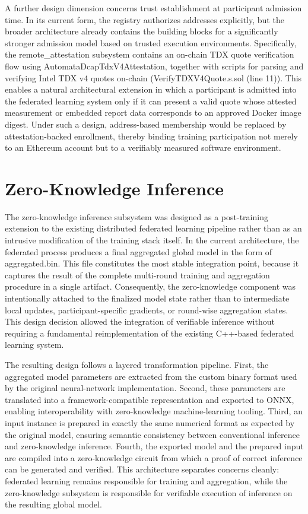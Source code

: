 A further design dimension concerns trust establishment at participant admission time. In its current form, the registry authorizes addresses explicitly, but the broader architecture already contains the building blocks for a significantly stronger admission model based on trusted execution environments. Specifically, the remote_attestation subsystem contains an on-chain TDX quote verification flow using AutomataDcapTdxV4Attestation, together with scripts for parsing and verifying Intel TDX v4 quotes on-chain (VerifyTDXV4Quote.s.sol (line 11)). This enables a natural architectural extension in which a participant is admitted into the federated learning system only if it can present a valid quote whose attested measurement or embedded report data corresponds to an approved Docker image digest. Under such a design, address-based membership would be replaced by attestation-backed enrollment, thereby binding training participation not merely to an Ethereum account but to a verifiably measured software environment.

\section{Zero-Knowledge Inference}

The zero-knowledge inference subsystem was designed as a post-training extension to the existing distributed federated learning pipeline rather than as an intrusive modification of the training stack itself. In the current architecture, the federated process produces a final aggregated global model in the form of aggregated.bin. This file constitutes the most stable integration point, because it captures the result of the complete multi-round training and aggregation procedure in a single artifact. Consequently, the zero-knowledge component was intentionally attached to the finalized model state rather than to intermediate local updates, participant-specific gradients, or round-wise aggregation states. This design decision allowed the integration of verifiable inference without requiring a fundamental reimplementation of the existing C++-based federated learning system.

The resulting design follows a layered transformation pipeline. First, the aggregated model parameters are extracted from the custom binary format used by the original neural-network implementation. Second, these parameters are translated into a framework-compatible representation and exported to ONNX, enabling interoperability with zero-knowledge machine-learning tooling. Third, an input instance is prepared in exactly the same numerical format as expected by the original model, ensuring semantic consistency between conventional inference and zero-knowledge inference. Fourth, the exported model and the prepared input are compiled into a zero-knowledge circuit from which a proof of correct inference can be generated and verified. This architecture separates concerns cleanly: federated learning remains responsible for training and aggregation, while the zero-knowledge subsystem is responsible for verifiable execution of inference on the resulting global model.

